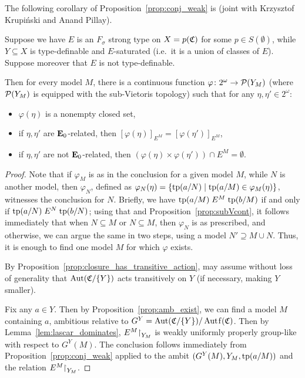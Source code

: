 	The following corollary of Proposition~\ref{prop:conj_weak} is \cite[Proposition 5.12]{KPR15} (joint with Krzysztof Krupiński and Anand Pillay).
	
	\begin{cor}
		\label{cor:nwg2}
		Suppose we have $E$ is an $F_\sigma$ strong type on $X=p({\mathfrak C})$ for some $p\in S(\emptyset)$, while $Y\subseteq X$ is type-definable and $E$-saturated (i.e.\ it is a union of classes of $E$). Suppose moreover that $E$ is not type-definable.
		
		Then for every model $M$, there is a continuous function $\varphi\colon 2^{\omega}\to {\mathcal P}(Y_M)$ (where ${\mathcal P}(Y_M)$ is equipped with the sub-Vietoris topology) such that for any $\eta,\eta'\in 2^{\omega}$:
		\begin{itemize}
			\item
			$\varphi(\eta)$ is a nonempty closed set,
			\item
			if $\eta,\eta'$ are $\mathrel{ { {\mathbf E}_0 } }$-related, then $[\varphi(\eta)]_{E^M}=[\varphi(\eta')]_{E^M}$,
			\item
			if $\eta,\eta'$ are not $\mathrel{ { {\mathbf E}_0 } }$-related, then $(\varphi(\eta)\times \varphi(\eta'))\cap E^M=\emptyset$.
		\end{itemize}
	\end{cor}
	\begin{proof}
		Note that if $\varphi_M$ is as in the conclusion for a given model $M$, while $N$ is another model, then $\varphi_N$, defined as $\varphi_N(\eta)=\{\operatorname{{tp}}(a/N)\mid \operatorname{{tp}}(a/M)\in \varphi_M(\eta) \}$, witnesses the conclusion for $N$. Briefly, we have $\operatorname{{tp}}(a/M)\mathrel{E}^M\operatorname{{tp}}(b/M)$ if and only if $\operatorname{{tp}}(a/N)\mathrel{E}^N \operatorname{{tp}}(b/N)$; using that and Proposition~\ref{prop:subVcont}, it follows immediately that when $N\subseteq M$ or $N\subseteq M$, then $\varphi_N$ is as prescribed, and otherwise, we can argue the same in two steps, using a model $N'\supseteq M\cup N$. Thus, it is enough to find one model $M$ for which $\varphi$ exists.
		
		By Proposition~\ref{prop:closure_has_transitive_action}, may assume without loss of generality that $\operatorname{{Aut}}({\mathfrak C}/\{Y\})$ acts transitively on $Y$ (if necessary, making $Y$ smaller).
		
		Fix any $a\in Y$. Then by Proposition~\ref{prop:amb_exist}, we can find a model $M$ containing $a$, ambitious relative to $G^Y=\Aut(\fC/\{Y\})/\Autf(\fC)$. Then by Lemma~\ref{lem:lascar_dominates}, $E^M\mathord{\upharpoonright}_{Y_M}$ is weakly uniformly properly group-like with respect to $G^Y(M)$. The conclusion follows immediately from Proposition~\ref{prop:conj_weak} applied to the ambit $(G^Y(M),Y_M,\operatorname{{tp}}(a/M))$ and the relation $E^M\mathord{\upharpoonright}_{Y_M}$.
	\end{proof}
	
